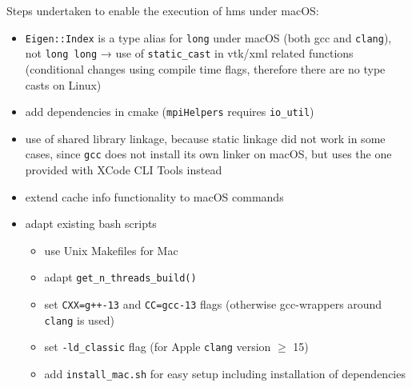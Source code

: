 Steps undertaken to enable the execution of \gls{hms} under macOS:

\begin{itemize}
  \item \texttt{Eigen::Index} is a type alias for \texttt{long} under macOS (both \gls{gcc} and \texttt{clang}), not \texttt{long long} → use of \texttt{static\_cast} in vtk/xml related functions (conditional changes using compile time flags, therefore there are no type casts on Linux)
  \item add dependencies in cmake (\texttt{mpiHelpers} requires \texttt{io\_util})
  \item use of shared library linkage, because static linkage did not work in some cases, since \texttt{gcc} does not install its own linker on macOS, but uses the one provided with XCode CLI Tools instead
  \item extend cache info functionality to macOS commands
  \item adapt existing bash scripts
        \begin{itemize}
          \item use Unix Makefiles for Mac
          \item adapt \texttt{get\_n\_threads\_build()}
          \item set \texttt{CXX=g++-13} and \texttt{CC=gcc-13} flags (otherwise \gls{gcc}-wrappers around \texttt{clang} is used) 
          \item set \texttt{-ld\_classic} flag (for Apple \texttt{clang} version $\geq$ 15)
          \item add \texttt{install\_mac.sh} for easy setup including installation of dependencies
        \end{itemize}
\end{itemize}